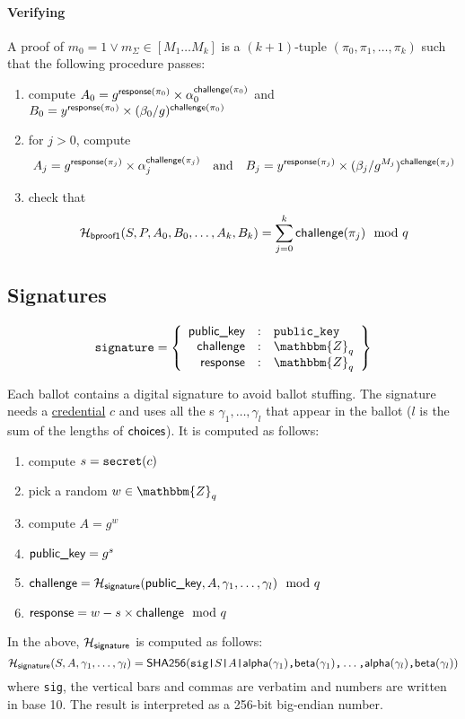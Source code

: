\documentclass[a4paper]{article}
\newcommand{\Z}{\mathbbm{Z}}
\newcommand{\shatwo}{\textsf{SHA256}}
\begin{document}
\paragraph{Verifying \oproof}
A proof of $m_0=1\lor m_\Sigma\in[M_1\dots M_k]$ is a $(k+1)$-tuple
$(\pi_0,\pi_1,\dotsc,\pi_k)$ such that the following procedure passes:
\begin{enumerate}
\item compute
  $A_0=g^{\textsf{response}(\pi_0)}\times\alpha_0^{\textsf{challenge}(\pi_0)}$
  and
  $B_0=y^{\textsf{response}(\pi_0)}\times(\beta_0/g)^{\textsf{challenge}(\pi_0)}$
\item for $j>0$, compute
  \[A_j=g^{\textsf{response}(\pi_j)}\times\alpha_j^{\textsf{challenge}(\pi_j)}
  \quad\text{and}\quad
  B_j=y^{\textsf{response}(\pi_j)}\times(\beta_j/g^{M_j})^{\textsf{challenge}(\pi_j)}\]
\item check that
  \[\mathcal{H}_{\textsf{bproof1}}(S,P,A_0,B_0,\dots,A_k,B_k)=\sum_{j=0}^k\textsf{challenge}(\pi_j)\mod q\]
\end{enumerate}

\subsection{Signatures}
\label{signatures}

\begin{gather*}
  \signature=\left\{
    \begin{array}{rcl}
      \pklabel&:&\pk\\
      \challenge&:&\Z_q\\
      \response&:&\Z_q
    \end{array}
  \right\}
\end{gather*}

\newcommand{\siglabel}{\textsf{signature}}

Each ballot contains a digital signature to avoid ballot stuffing. The
signature needs a \hyperref[credentials]{credential} $c$ and uses all
the \ciphertext{}s $\gamma_1,\dots,\gamma_l$ that appear in the ballot
($l$ is the sum of the lengths of $\textsf{choices}$). It is computed as
follows:
\begin{enumerate}
\item compute $s=\texttt{secret}(c)$
\item pick a random $w\in\Z_q$
\item compute $A=g^w$
\item $\textsf{public\_key}=g^s$
\item $\challenge=\Hash_\siglabel(\pklabel,A,\gamma_1,\dots,\gamma_l)\mod q$
\item $\textsf{response}=w-s\times\textsf{challenge}\mod q$
\end{enumerate}
In the above, $\Hash_\siglabel$ is computed as follows:
\[
\Hash_\siglabel(S,A,\gamma_1,\dots,\gamma_l)=\shatwo(\verb=sig|=S\verb=|=A\verb=|=\alphalabel(\gamma_1)\verb=,=\betalabel(\gamma_1)\verb=,=\dots\verb=,=\alphalabel(\gamma_l)\verb=,=\betalabel(\gamma_l))
\]
where \verb=sig=, the vertical bars and commas are verbatim and
numbers are written in base 10. The result is interpreted as a 256-bit
big-endian number.
\end{document}
